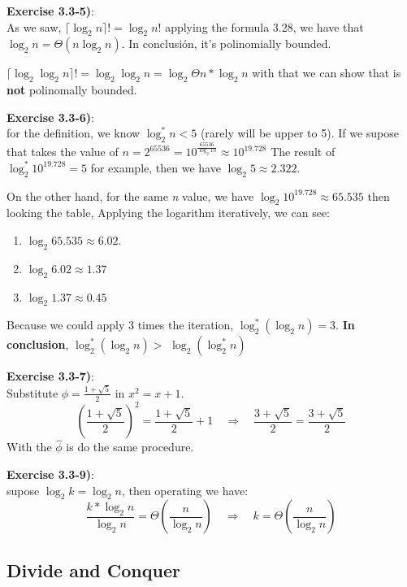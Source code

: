 \documentclass{article}
\newcounter{exercise}[section]   %
\begin{document}
\textbf{Exercise 3.3-5)}:\\
As we saw, \(\lceil \log_2 n \rceil! = \log_2 n!\) applying the formula 3.28, we have that
\(\log_2 n = \Theta(n \log_2 n)\). In conclusión, it's polinomially bounded.

\(\lceil \log_2{\log_2 n} \rceil! = \log_2{\log_2 n} = \log_2{\Theta{n * \log_2 n}}\)
with that we can show that is \textbf{not} polinomally bounded.

\textbf{Exercise 3.3-6)}:\\
for the definition, we know \(\log_2^* n < 5\) (rarely will be upper to 5). If we supose that
takes the value of \(n = 2^{65536} = 10^{\frac{65536}{\log_2 10}} \approx 10^{19.728}\) The result of
\(\log_2^* 10^19.728 = 5\) for example, then we have \(\log_2 5 \approx  2.322\).

On the other hand, for the same \textit{n} value, we have \(\log_2 10^19.728 \approx 65.535\)
then looking the table, Applying the logarithm iteratively, we can see:
\begin{enumerate}
    \item \(\log_2 65.535 \approx 6.02\).
    \item \(\log_2 6.02 \approx 1.37\)
    \item \(\log_2 1.37 \approx 0.45\)
\end{enumerate}
Because we could apply 3 times the iteration, \(\log_2^*(\log_2 n) = 3\).
\textbf{In conclusion}, \(\log_2^*(\log_2 n) >\) \(\log_2(\log_2^* n)\)

\textbf{Exercise 3.3-7)}:\\
Substitute \(\phi = \frac{1 + \sqrt{5}}{2}\) in \(x^2 = x + 1\).
\[
\left(\frac{1 + \sqrt{5}}{2}\right)^2 = \frac{1 + \sqrt{5}}{2} + 1 \quad \Rightarrow \quad
\frac{3 + \sqrt{5}}{2} = \frac{3 + \sqrt{5}}{2}  
\]
With the \(\widehat{\phi}\) is do the same procedure.

\textbf{Exercise 3.3-9)}:\\
supose \(\log_2 k = \log_2 n\), then operating we have: 
\[
\frac{k * \log_2 n}{\log_2 n} = \Theta\left(\frac{n}{\log_2 n}\right) \quad \Rightarrow \quad
k = \Theta\left(\frac{n}{\log_2 n}\right)
\]

\subsection{Divide and Conquer}
\setcounter{exercise}{0}
\end{document}
